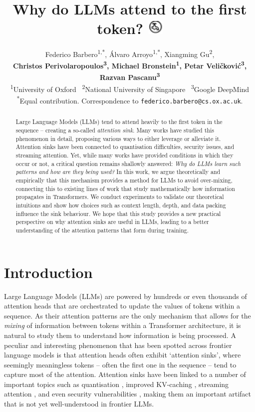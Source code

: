 \documentclass{article} %
\title{Why do LLMs attend to the first token? \includegraphics[width=1em]{figures/emoji.pdf}}
\author{Federico Barbero\textsuperscript{1,*}, \'{A}lvaro Arroyo\textsuperscript{1,*}, Xiangming Gu\textsuperscript{2}, \\
\textbf{Christos Perivolaropoulos\textsuperscript{3}, Michael Bronstein\textsuperscript{1}, Petar Veli\v{c}kovi\'{c}\textsuperscript{3}, Razvan Pascanu\textsuperscript{3}} \\
\textsuperscript{1}University of Oxford \ \textsuperscript{2}National University of Singapore \ \textsuperscript{3}Google DeepMind \\
\textsuperscript{*}Equal contribution. Correspondence to \texttt{federico.barbero@cs.ox.ac.uk}.
}
\begin{document}
\ifcolmsubmission
\linenumbers
\fi

\maketitle

\begin{abstract}
Large Language Models (LLMs) tend to attend heavily to the first token in the sequence -- creating a so-called \emph{attention sink}. Many works have studied this phenomenon in detail, proposing various ways to either leverage or alleviate it. Attention sinks have been connected to quantisation difficulties, security issues, and streaming attention. Yet, while many works have provided conditions in which they occur or not, a critical question remains shallowly answered: \emph{Why do LLMs learn such patterns and how are they being used?} In this work, we argue theoretically and empirically that this mechanism provides a method for LLMs to avoid over-mixing, connecting this to existing lines of work that study mathematically how information propagates in Transformers. We conduct experiments to validate our theoretical intuitions and show how choices such as context length, depth, and data packing influence the sink behaviour. We hope that this study provides a new practical perspective on why attention sinks are useful in LLMs, leading to a better understanding of the attention patterns that form during training. 
\end{abstract}

\section{Introduction}
Large Language Models (LLMs) are powered by hundreds or even thousands of attention heads that are orchestrated to update the values of tokens within a sequence. As their attention patterns are the only mechanism that allows for the \emph{mixing} of information between tokens within a Transformer architecture, it is natural to study them to understand how information is being processed. A peculiar and interesting phenomenon that has been spotted across frontier language models is that attention heads often exhibit `attention sinks', where seemingly meaningless tokens -- often the first one in the sequence -- tend to capture most of the attention. Attention sinks have been linked to a number of important topics such as quantisation \citep{liu-etal-2024-intactkv}, improved KV-caching \citep{ge2024model}, streaming attention \citep{xiao2024efficient}, and even security vulnerabilities \citep{yona2025interpreting}, making them an important artifact that is not yet well-understood in frontier LLMs.
\end{document}

